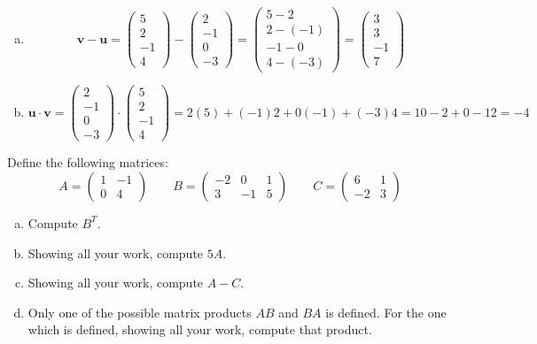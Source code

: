 \documentclass[12pt,letterpaper]{exam}
\begin{document}
\begin{questions}
\begin{enumerate}[(a)]
\item 
	\[
	\mathbf{v} - \mathbf{u}= \begin{pmatrix} 5 \\ 2 \\ -1 \\ 4 \end{pmatrix} - \begin{pmatrix} 2 \\ -1 \\ 0 \\ -3 \end{pmatrix}= \begin{pmatrix} 5 - 2 \\ 2 - (-1) \\ -1 - 0 \\ 4 - (-3) \end{pmatrix}= \begin{pmatrix} 3 \\ 3 \\ -1 \\ 7 \end{pmatrix}
	\] \pspace

\item 
	\[
	\mathbf{u} \cdot \mathbf{v}= \begin{pmatrix} 2 \\ -1 \\ 0 \\ -3 \end{pmatrix} \cdot \begin{pmatrix} 5 \\ 2 \\ -1 \\ 4 \end{pmatrix}= 2(5) + (-1)2 + 0(-1) + (-3)4= 10 - 2 + 0 - 12= -4
	\]
\end{enumerate}



\newpage
\question[10] Define the following matrices:
	\[
	A= \begin{pmatrix} 1 & -1 \\ 0 & 4 \end{pmatrix} \qquad
	B= \begin{pmatrix} -2 & 0 & 1 \\ 3 & -1 & 5 \end{pmatrix} \qquad
	C= \begin{pmatrix} 6 & 1 \\ -2 & 3 \end{pmatrix}
	\]

\begin{enumerate}[(a)]
\item Compute $B^T$.
\item Showing all your work, compute $5A$.
\item Showing all your work, compute $A - C$.
\item Only one of the possible matrix products $AB$ and $BA$ is defined. For the one which is defined, showing all your work, compute that product. 
\end{enumerate} \pspace


\end{questions}
\end{document}
